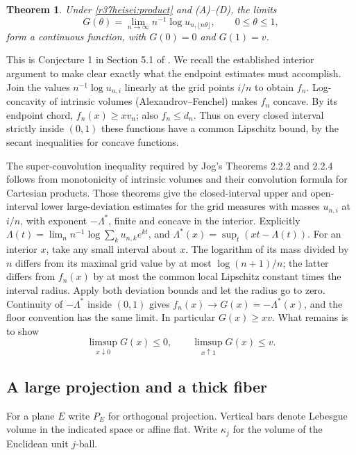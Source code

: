\documentclass[11pt,a4paper]{article}
\numberwithin{equation}{section}
\newtheorem{theorem}{Theorem}[section]
\theoremstyle{definition}
\theoremstyle{remark}
\begin{document}
\begin{theorem}\label{r37heisei:main}
Under \eqref{r37heisei:product} and (A)--(D), the limits
\[
 G(\theta)=\lim_{n\to\infty}n^{-1}\log u_{n,\lfloor n\theta\rfloor},
 \qquad 0\le\theta\le1,
\]
form a continuous function, with $G(0)=0$ and $G(1)=v$.
\end{theorem}

This is Conjecture 1 in Section 5.1 of \cite{r37heisei:jog}. We recall the established interior argument to make clear exactly what the endpoint estimates must accomplish. Join the values $n^{-1}\log u_{n,i}$ linearly at the grid points $i/n$ to obtain $f_n$. Log-concavity of intrinsic volumes (Alexandrov--Fenchel) makes $f_n$ concave. By its endpoint chord, $f_n(x)\ge x v_n$; also $f_n\le d_n$. Thus on every closed interval strictly inside $(0,1)$ these functions have a common Lipschitz bound, by the secant inequalities for concave functions.

The super-convolution inequality required by Jog's Theorems 2.2.2 and 2.2.4 follows from monotonicity of intrinsic volumes and their convolution formula for Cartesian products. Those theorems give the closed-interval upper and open-interval lower large-deviation estimates for the grid measures with masses $u_{n,i}$ at $i/n$, with exponent $-\Lambda^*$, finite and concave in the interior. Explicitly $\Lambda(t)=\lim_n n^{-1}\log\sum_k u_{n,k}e^{kt}$, and $\Lambda^*(x)=\sup_t(xt-\Lambda(t))$. For an interior $x$, take any small interval about $x$. The logarithm of its mass divided by $n$ differs from its maximal grid value by at most $\log(n+1)/n$; the latter differs from $f_n(x)$ by at most the common local Lipschitz constant times the interval radius. Apply both deviation bounds and let the radius go to zero. Continuity of $-\Lambda^*$ inside $(0,1)$ gives $f_n(x)\to G(x)=-\Lambda^*(x)$, and the floor convention has the same limit. In particular $G(x)\ge xv$. What remains is to show
\[
 \limsup_{x\downarrow0}G(x)\le0,\qquad
 \limsup_{x\uparrow1}G(x)\le v.
\]

\subsection{A large projection and a thick fiber}
For a plane $E$ write $P_E$ for orthogonal projection. Vertical bars denote Lebesgue volume in the indicated space or affine flat. Write $\kappa_j$ for the volume of the Euclidean unit $j$-ball.
\end{document}
